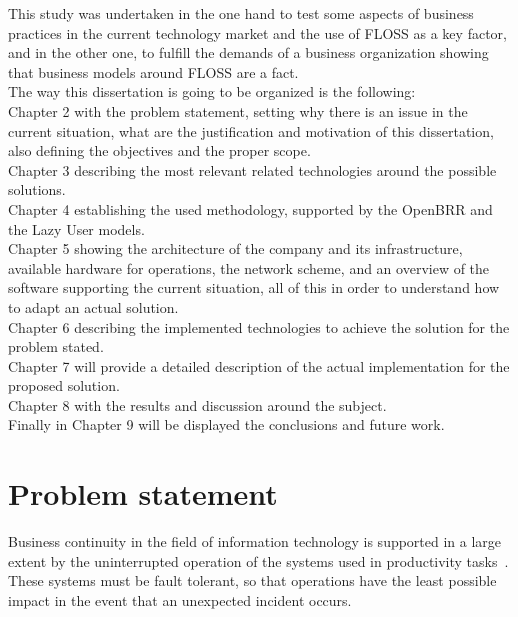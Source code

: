 \documentclass[a4paper, 12pt]{book}
\begin{document}
\noindent This study was undertaken in the one hand to test some aspects of business practices in the current technology market and the use of FLOSS as a key factor, and in the other one, to fulfill the demands of a business organization showing that business models around FLOSS are a fact.\\

\noindent The way this dissertation is going to be organized is the following:\\

\noindent Chapter 2 with the problem statement, setting why there is an issue in the current situation, what are the justification and motivation of this dissertation, also defining the objectives and the proper scope.\\

\noindent Chapter 3 describing the most relevant related technologies around the possible solutions.\\

\noindent Chapter 4 establishing the used methodology, supported by the OpenBRR and the Lazy User models.\\

\noindent Chapter 5 showing the architecture of the company and its infrastructure, available hardware for operations, the network scheme, and an overview of the software supporting the current situation, all of this in order to understand how to adapt an actual solution.\\

\noindent Chapter 6 describing the implemented technologies to achieve the solution for the problem stated.\\

\noindent Chapter 7 will provide a detailed description of the actual implementation for the proposed solution.\\

\noindent Chapter 8 with the results and discussion around the subject.\\

\noindent Finally in Chapter 9 will be displayed the conclusions and future work.


%
\chapter{Problem statement}
\label{chap:problem}

Business continuity in the field of information technology is supported in a large extent by the uninterrupted operation of the systems used in productivity tasks~\cite{ISO}. These systems must be fault tolerant, so that operations have the least possible impact in the event that an unexpected incident occurs.\\
\end{document}
